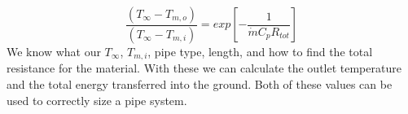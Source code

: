 %
\begin{equation}
    \frac { ({ T }_{ \infty  }-{ T }_{ m,o }) }{ ({ T }_{ \infty  }-{ T }_{ m,i }) } =exp\left[ -\frac { 1 }{ \dot { m } { C }_{ p }{ R }_{ tot } }  \right] 
\end{equation}
%
We know what our ${ T }_{ \infty }$, ${ T }_{ m,i }$, pipe type, length, and how to find the total resistance for the material. With these we can calculate the outlet temperature and the total energy transferred into the ground. Both of these values can be used to correctly size a pipe system.